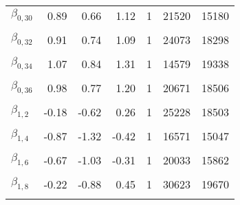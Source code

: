 \begin{table}
\begin{tabular}[t]{lrrrrrr}
$\beta_{0, 30}$ & 0.89 & 0.66 & 1.12 & 1 & 21520 & 15180\\
\cellcolor{gray!6}{$\beta_{0, 31}$} & \cellcolor{gray!6}{0.75} & \cellcolor{gray!6}{0.48} & \cellcolor{gray!6}{1.01} & \cellcolor{gray!6}{1} & \cellcolor{gray!6}{13212} & \cellcolor{gray!6}{11883}\\
$\beta_{0, 32}$ & 0.91 & 0.74 & 1.09 & 1 & 24073 & 18298\\
\cellcolor{gray!6}{$\beta_{0, 33}$} & \cellcolor{gray!6}{1.02} & \cellcolor{gray!6}{0.87} & \cellcolor{gray!6}{1.17} & \cellcolor{gray!6}{1} & \cellcolor{gray!6}{23078} & \cellcolor{gray!6}{18513}\\
$\beta_{0, 34}$ & 1.07 & 0.84 & 1.31 & 1 & 14579 & 19338\\
\cellcolor{gray!6}{$\beta_{0, 35}$} & \cellcolor{gray!6}{0.61} & \cellcolor{gray!6}{0.40} & \cellcolor{gray!6}{0.81} & \cellcolor{gray!6}{1} & \cellcolor{gray!6}{9639} & \cellcolor{gray!6}{12860}\\
$\beta_{0, 36}$ & 0.98 & 0.77 & 1.20 & 1 & 20671 & 18506\\
\cellcolor{gray!6}{$\beta_{1, 1}$} & \cellcolor{gray!6}{-0.20} & \cellcolor{gray!6}{-0.60} & \cellcolor{gray!6}{0.19} & \cellcolor{gray!6}{1} & \cellcolor{gray!6}{27319} & \cellcolor{gray!6}{19836}\\
$\beta_{1, 2}$ & -0.18 & -0.62 & 0.26 & 1 & 25228 & 18503\\
\cellcolor{gray!6}{$\beta_{1, 3}$} & \cellcolor{gray!6}{-0.40} & \cellcolor{gray!6}{-0.87} & \cellcolor{gray!6}{0.07} & \cellcolor{gray!6}{1} & \cellcolor{gray!6}{25278} & \cellcolor{gray!6}{18596}\\
$\beta_{1, 4}$ & -0.87 & -1.32 & -0.42 & 1 & 16571 & 15047\\
\cellcolor{gray!6}{$\beta_{1, 5}$} & \cellcolor{gray!6}{-0.04} & \cellcolor{gray!6}{-0.39} & \cellcolor{gray!6}{0.31} & \cellcolor{gray!6}{1} & \cellcolor{gray!6}{25848} & \cellcolor{gray!6}{18165}\\
$\beta_{1, 6}$ & -0.67 & -1.03 & -0.31 & 1 & 20033 & 15862\\
\cellcolor{gray!6}{$\beta_{1, 7}$} & \cellcolor{gray!6}{0.14} & \cellcolor{gray!6}{-0.21} & \cellcolor{gray!6}{0.51} & \cellcolor{gray!6}{1} & \cellcolor{gray!6}{12544} & \cellcolor{gray!6}{11506}\\
$\beta_{1, 8}$ & -0.22 & -0.88 & 0.45 & 1 & 30623 & 19670\\
\cellcolor{gray!6}{$\beta_{1, 9}$} & \cellcolor{gray!6}{-0.18} & \cellcolor{gray!6}{-0.59} & \cellcolor{gray!6}{0.23} & \cellcolor{gray!6}{1} & \cellcolor{gray!6}{21072} & \cellcolor{gray!6}{14587}\\

\end{tabular}
\end{table}
